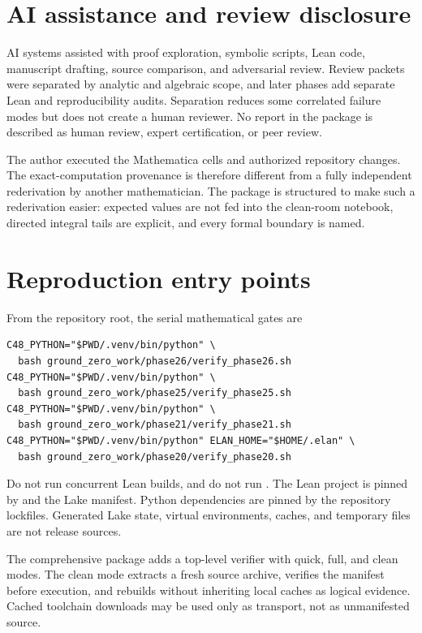 \documentclass[10pt]{article}
\begin{document}
\section{AI assistance and review disclosure}\label{sup:disclosure}

AI systems assisted with proof exploration, symbolic scripts, Lean code,
manuscript drafting, source comparison, and adversarial review.  Review
packets were separated by analytic and algebraic scope, and later phases add
separate Lean and reproducibility audits.  Separation reduces some correlated
failure modes but does not create a human reviewer.  No report in the package
is described as human review, expert certification, or peer review.

The author executed the Mathematica cells and authorized repository changes.
The exact-computation provenance is therefore different from a fully
independent rederivation by another mathematician.  The package is structured
to make such a rederivation easier: expected values are not fed into the
clean-room notebook, directed integral tails are explicit, and every formal
boundary is named.

\section{Reproduction entry points}\label{sup:reproduction}

From the repository root, the serial mathematical gates are
\begin{verbatim}
C48_PYTHON="$PWD/.venv/bin/python" \
  bash ground_zero_work/phase26/verify_phase26.sh
C48_PYTHON="$PWD/.venv/bin/python" \
  bash ground_zero_work/phase25/verify_phase25.sh
C48_PYTHON="$PWD/.venv/bin/python" \
  bash ground_zero_work/phase21/verify_phase21.sh
C48_PYTHON="$PWD/.venv/bin/python" ELAN_HOME="$HOME/.elan" \
  bash ground_zero_work/phase20/verify_phase20.sh
\end{verbatim}
Do not run concurrent Lean builds, and do not run .  The
Lean project is pinned by \code{lean-toolchain} and the Lake manifest.
Python dependencies are pinned by the repository lockfiles.  Generated Lake
state, virtual environments, caches, and temporary files are not release
sources.

The comprehensive package adds a top-level verifier with quick, full, and
clean modes.  The clean mode extracts a fresh source archive, verifies the
manifest before execution, and rebuilds without inheriting local caches as
logical evidence.  Cached toolchain downloads may be used only as transport,
not as unmanifested source.



\end{document}
